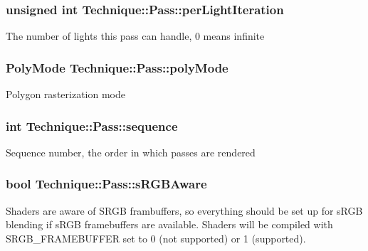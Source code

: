 \subsubsection[{\texorpdfstring{per\+Light\+Iteration}{perLightIteration}}]{\setlength{\rightskip}{0pt plus 5cm}unsigned int Technique\+::\+Pass\+::per\+Light\+Iteration}\hypertarget{classTechnique_1_1Pass_ae3a7e3b070bf65db8c82a2089c9555b9}{}\label{classTechnique_1_1Pass_ae3a7e3b070bf65db8c82a2089c9555b9}
The number of lights this pass can handle, 0 means infinite 
\subsubsection[{\texorpdfstring{poly\+Mode}{polyMode}}]{\setlength{\rightskip}{0pt plus 5cm}Poly\+Mode Technique\+::\+Pass\+::poly\+Mode}\hypertarget{classTechnique_1_1Pass_ae7db258ed161fbe892392a069451db12}{}\label{classTechnique_1_1Pass_ae7db258ed161fbe892392a069451db12}
Polygon rasterization mode 
\subsubsection[{\texorpdfstring{sequence}{sequence}}]{\setlength{\rightskip}{0pt plus 5cm}int Technique\+::\+Pass\+::sequence}\hypertarget{classTechnique_1_1Pass_a4fb8583c7e17e7471e41307846c5a4eb}{}\label{classTechnique_1_1Pass_a4fb8583c7e17e7471e41307846c5a4eb}
Sequence number, the order in which passes are rendered 
\subsubsection[{\texorpdfstring{s\+R\+G\+B\+Aware}{sRGBAware}}]{\setlength{\rightskip}{0pt plus 5cm}bool Technique\+::\+Pass\+::s\+R\+G\+B\+Aware}\hypertarget{classTechnique_1_1Pass_aeea18866a5394c4b0f8a10a356218d28}{}\label{classTechnique_1_1Pass_aeea18866a5394c4b0f8a10a356218d28}
Shaders are aware of S\+R\+GB frambuffers, so everything should be set up for s\+R\+GB blending if s\+R\+GB framebuffers are available. Shaders will be compiled with S\+R\+G\+B\+\_\+\+F\+R\+A\+M\+E\+B\+U\+F\+F\+ER set to 0 (not supported) or 1 (supported). 
